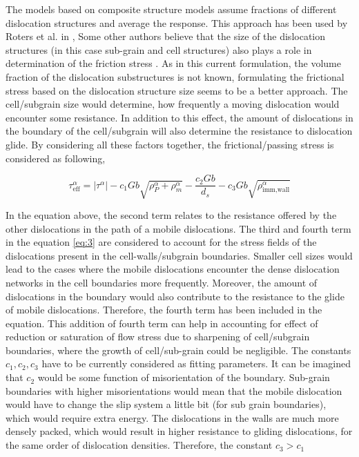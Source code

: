 \documentclass[a4paper,11pt]{article}
\begin{document}
The models based on composite structure models assume fractions of different dislocation structures and average the response. This approach has been used by Roters et al. in \cite{Roters2000}, \cite{Ma2004}
Some other authors believe that the size of the dislocation structures (in this case sub-grain and cell structures) also plays a role in determination of the friction stress \cite{Nes1997}. 
As in this current formulation, the volume fraction of the dislocation substructures is not known, formulating the frictional stress based on the dislocation structure size seems to be a better approach.
The cell/subgrain size would determine, how frequently a moving dislocation would encounter some resistance. In addition to this effect, the amount of dislocations in the boundary of the cell/subgrain will also determine 
the resistance to dislocation glide. By considering all these factors together, the frictional/passing stress is considered as following,

\begin{equation} 
\tau_{\text{eff}}^\alpha = \left|\tau^\alpha\right| - c_1 G b \sqrt{\rho_P^\alpha + \rho_m^\alpha} - \frac{c_2 G b}{d_s} - c_3 G b \sqrt{\rho_{\text{imm,wall}}^\alpha} \label{eq:3}
\end{equation}

In the equation above, the second term relates to the resistance offered by the other dislocations in the path of a mobile dislocations. 
The third and fourth term in the equation \eqref{eq:3} are considered to account for the stress fields of the dislocations present in the cell-walls/subgrain boundaries.
Smaller cell sizes would lead to the cases where the mobile dislocations encounter the dense dislocation networks in the cell boundaries more frequently. 
Moreover, the amount of dislocations in the boundary would also contribute to the resistance to the glide of mobile dislocations. 
Therefore, the fourth term has been included in the equation. 
This addition of fourth term can help in accounting for effect of reduction or saturation of flow stress due to sharpening of cell/subgrain boundaries, where the growth of cell/sub-grain could be negligible. 
The constants \begin{math} c_1,c_2,c_3 \end{math} have to be currently considered as fitting parameters. 
It can be imagined that \begin{math} c_2 \end{math} would be some function of misorientation of the boundary. 
Sub-grain boundaries with higher misorientations would mean that the mobile dislocation would have to change the slip system a little bit (for sub grain boundaries), which would require extra energy.  
The dislocations in the walls are much more densely packed, which would result in higher resistance to gliding dislocations, for the same order of dislocation densities. 
Therefore, the constant \begin{math} c_3 > c_1 \end{math}
\end{document}
